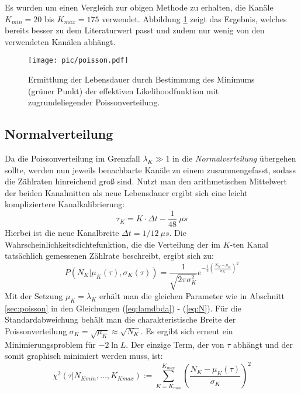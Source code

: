		Es wurden um einen Vergleich zur obigen Methode zu erhalten, die Kanäle $K_{min} = 20$ bis $K_{max} = 175$ verwendet. Abbildung \ref{fig:LDpoisson} zeigt das Ergebnis, welches bereits besser zu dem Literaturwert passt und zudem nur wenig von den verwendeten Kanälen abhängt.
		\begin{figure}[hp]
		      			\centering
		      			\captionsetup{justification=centering}
		      			\texttt{[image: pic/poisson.pdf]}
		      			\caption{Ermittlung der Lebensdauer durch Bestimmung des Minimums (grüner Punkt) der effektiven Likelihoodfunktion mit zugrundeliegender Poissonverteilung.}
		      			\label{fig:LDpoisson}
		\end{figure}
   \subsection{Normalverteilung}	
   Da die Poissonverteilung im Grenzfall $\lambda_K \gg 1$ in die \textit{Normalverteilung} übergehen sollte, werden nun jeweils benachbarte Kanäle zu einem zusammengefasst, sodass die Zählraten hinreichend groß sind. Nutzt man den arithmetischen Mittelwert der beiden Kanalmitten als neue Lebensdauer ergibt sich eine leicht kompliziertere Kanalkalibrierung:
   		\begin{equation}
   				\tau_K = K \cdot \Delta t - \frac{1}{48}\ \unit{\mu s}	
   		\end{equation} 
   Hierbei ist die neue Kanalbreite $\Delta t = 1/12\ \unit{\mu s}$. Die Wahrscheinlichkeitsdichtefunktion, die die Verteilung der im $K$-ten Kanal tatsächlich gemessenen Zählrate beschreibt, ergibt sich zu:
   		\begin{equation}
      			P(N_K|\mu_K(\tau),\sigma_K(\tau)) = \frac{1}{\sqrt{2\pi\sigma_K^2}}e^{-\frac{1}{2}\left(\frac{N_K- \mu_K}{\sigma_K}\right)^2}	
      	\end{equation} 
    Mit der Setzung $\mu_K = \lambda_K$ erhält man die gleichen Parameter wie in Abschnitt \ref{sec:poisson} in den Gleichungen (\ref{eq:lamdbda}) - (\ref{eq:N}). Für die Standardabweichung behält man die charakteristische Breite der Poissonverteilung $\sigma_K = \sqrt{\mu_K} \approx\sqrt{N_K}$.
    Es ergibt sich erneut ein Minimierungsproblem für $-2\ln L$. Der einzige Term, der von $\tau$ abhängt und der somit graphisch minimiert werden muss, ist:
    	\begin{equation}
          	\chi^2(\tau|N_{Kmin},\dots,K_{Kmax}) := \sum_{K = K_{min}}^{K_{max}} \left(\frac{N_K - \mu_K(\tau)}{\sigma_K}\right)^2	
         \end{equation}
